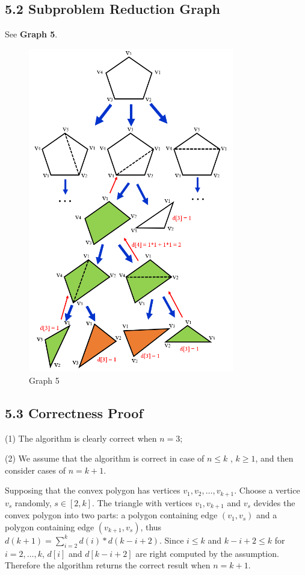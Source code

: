 \documentclass[UTF8]{ctexart}
\begin{document}
\subsection*{5.2 Subproblem Reduction Graph} 
See \textbf{Graph 5}.
\begin{figure} [htb]
	\centering
	\caption*{Graph 5}
	\includegraphics[width=0.8\textwidth]{figs/5.png}
\end{figure}

\subsection*{5.3 Correctness Proof} 
(1) The algorithm is clearly correct when $n = 3$;

(2) We assume that the algorithm is correct in case of $n \leq k$ , $k\geq 1$, and then consider cases of $n = k + 1$.

Supposing that the convex polygon has vertices $v_1, v_2, \ldots, v_{k+1}$. Choose a vertice $v_s$ randomly, $s \in [2, k]$. The triangle with vertices $v_1, v_{k+1}$ and $v_s$
devides the convex polygon into two parts: a polygon containing edge $(v_1, v_s)$ and a polygon containing edge $(v_{k+1}, v_s)$, thus $d(k+1) = \sum_{i=2}^{k} d(i) * d(k-i+2)$. 
Since $i \leq k$ and $k-i+2 \leq k$ for $i = 2, \ldots, k$, $d[i]$ and $d[k-i+2]$ are right computed by the assumption. Therefore the algorithm returns the correct result when $n = k+1$. 
\end{document}
